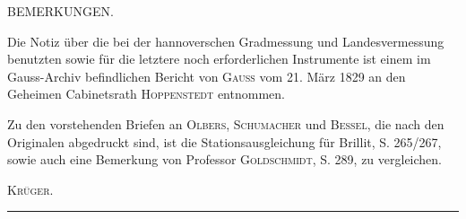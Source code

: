 {\small
\begin{center}BEMERKUNGEN.\end{center}
\par\noindent\hspace*{\parindent}Die Notiz über die bei der hannoverschen Gradmessung und Landesvermessung benutzten sowie für die letztere noch erforderlichen Instrumente ist einem im Gauss-Archiv befindlichen Bericht von \textsc{Gauss} vom 21. März 1829 an den Geheimen Cabinetsrath \textsc{Hoppenstedt} entnommen.
\par\noindent\hspace*{\parindent}Zu den vorstehenden Briefen an \textsc{Olbers}, \textsc{Schumacher} und \textsc{Bessel}, die nach den Originalen abgedruckt sind, ist die Stationsausgleichung für Brillit, S. 265/267, sowie auch eine Bemerkung von Professor \textsc{Goldschmidt}, S. 289, zu vergleichen.
\par\noindent\hfill\textsc{Krüger.}\hspace*{1em}\par}
\vspace{1cm}
\begin{center}\rule{3.5cm}{.4pt}\end{center}
\par\medskip\noindent\makebox[.86\linewidth][r]{63\textsuperscript{*}}\par

